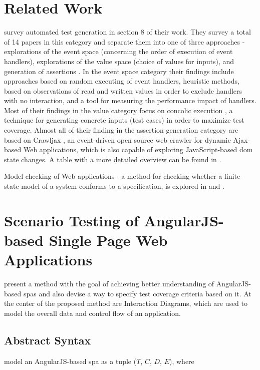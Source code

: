 \section{Related Work}
\textcite{andreasen2017survey} survey automated test generation in section 8 of their work\parencite[23-25]{andreasen2017survey}. They survey a total of 14 papers in this category and separate them into one of three approaches - explorations of the event space (concerning the order of execution of event handlers), explorations of the value space (choice of values for inputs), and generation of assertions \parencite{andreasen2017survey}. 
In the event space category their findings include 
approaches based on random executing of event handlers, heuristic methods, based on observations of read and written values in order to exclude handlers with no interaction, and a tool for measuring the performance impact of handlers. Most of their findings in the value category focus on concolic execution \parencite{godefroid2005dart}, a technique for generating concrete inputs (test cases) in order to maximize test coverage. Almost all of their finding in the assertion generation category are based on
Crawljax \parencite{crawljax2021Feb}, an event-driven open source web crawler for dynamic Ajax-based Web applications, which is also capable of exploring JavaScript-based \gls{dom} state changes.
A table with a more detailed overview can be found in \parencite[24]{andreasen2017survey}.

Model checking of Web applications - a method for checking whether a finite-state model of a system conforms to a specification, is explored in \parencite{zhang2019scenario} and \parencite{gao2019model}.
\section{Scenario Testing of AngularJS-based Single Page Web Applications}
\textcite{zhang2019scenario} present a method with the goal of achieving better understanding of AngularJS-based \glspl{spa} and also devise a way to specify test coverage criteria based on it. At the center of the proposed method are Interaction Diagrams, which are used to model the overall data and control flow of an application\parencite{zhang2019scenario}.

\subsection{Abstract Syntax}
\textcite{zhang2019scenario} model an AngularJS-based \gls{spa} as a tuple ($T$, $C$, $D$, $E$), where

